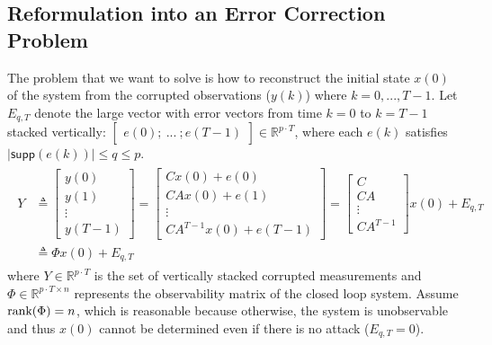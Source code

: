\documentclass[../../thesis.tex]{subfiles}
\begin{document}
\subsection{Reformulation into an Error Correction Problem} \label{sec:err_corr}

The problem that we want to solve is how to reconstruct the initial state $x(0)$ of the system from the corrupted observations ($y(k)$) where $k=0,...,T-1$.
Let $E_{q,T}$ denote the large vector with error vectors from time $k=0$ to $k=T-1$ stacked vertically: $\begin{bmatrix} e(0); ~ ...~  ;  e(T-1) \end{bmatrix}   \in  \mathbb{R}^{p\cdot T} $, where each $e(k)$ satisfies $\lvert \textsf{supp}(e(k)) \rvert \le q \le p $.%
\begin{eqnarray} \label{eq:sys_err_corr}
\begin{aligned}
	Y &\triangleq \begin{bmatrix} y(0) \\ y(1) \\ \vdots \\ y(T-1) \end{bmatrix} 
		= \begin{bmatrix} Cx(0) + e(0) \\ CA x(0) + e(1) \\ \vdots \\ CA^{T-1} x(0) + e(T-1) \end{bmatrix} =
		\begin{bmatrix} C \\ CA \\ \vdots \\ CA^{T-1} \end{bmatrix} x(0) + E_{q,T}\\& \triangleq \Phi x(0) + E_{q,T} 
\end{aligned} 
		\label{eq:decoder_Phi}
\end{eqnarray}
where $Y \in \mathbb{R}^{p\cdot T}$ is the set of vertically stacked corrupted measurements and $\Phi \in \mathbb{R}^{p\cdot T \times n}$ represents the observability matrix of the closed loop system. Assume $\text{rank}(\Phi) \\= n$, which is reasonable because otherwise, the system is unobservable and thus $x(0)$ cannot be determined even if there is no attack ($E_{q,T} = 0$).%
\end{document}

